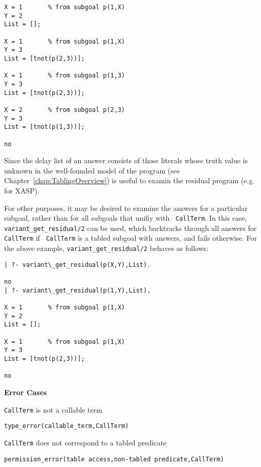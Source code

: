\begin{description}
\begin{example}
\begin{center}
\begin{small}
\begin{verbatim}
X = 1       % from subgoal p(1,X)
Y = 2
List = [];

X = 1       % from subgoal p(1,X)
Y = 3
List = [tnot(p(2,3))];

X = 1       % from subgoal p(1,3)
Y = 3
List = [tnot(p(2,3))];

X = 2       % from subgoal p(2,3)
Y = 3
List = [tnot(p(1,3))];

no
\end{verbatim}
\end{small}
\end{center}
\end{example}

Since the delay list of an answer consists of those literals whose
truth value is unknown in the well-founded model of the program (see
Chapter~\ref{chap:TablingOverview})  is useful
to examin the residual program (e.g. for XASP).

For other purposes, it may be desired to examine the answers for a
particular subgoal, rather than for all subgoals that unifiy with {\tt
  CallTerm}.  In this case, {\tt variant\_get\_residual/2} can be
used, which backtracks through all answers for {\tt CallTerm} if {\tt
  CallTerm} is a tabled subgoal with answers, and fails otherwise.
For the above example, {\tt variant\_get\_residual/2} behaves as
follows:

\begin{center}
\begin{small}
\begin{verbatim} 
| ?- variant\_get_residual(p(X,Y),List).

no
| ?- variant\_get_residual(p(1,Y),List).

X = 1       % from subgoal p(1,X)
Y = 2
List = [];

X = 1       % from subgoal p(1,X)
Y = 3
List = [tnot(p(2,3))];

no
\end{verbatim}
\end{small}
\end{center}

{\bf Error Cases}
\bi
\item {\tt CallTerm} is not a callable term
\bi
\item {\tt type\_error(callable\_term,CallTerm)}
\ei
\item {\tt CallTerm} does not correspond to a tabled predicate
\bi
\item 	{\tt permission\_error(table access,non-tabled predicate,{\tt CallTerm})}
\ei
\ei


\end{description}
